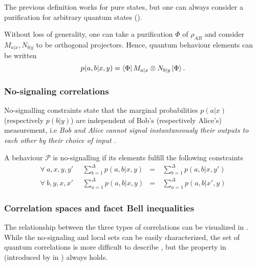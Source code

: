 The previous definition works for pure states, but one can always consider a purification for arbitrary quantum states ().

\begin{proposition} \label{prop:qu_corr} Without loss of generality, one can
take a purification $\Phi$ of $\rho_{AB}$ and consider $M_{a|x} ,N_{b|y}$ to be
orthogonal projectors. Hence, quantum behaviour elements can be written
\begin{equation}
        p(a,b|x,y) = \bra{\Phi}  M_{a|x} \otimes N_{b|y} \ket{\Phi} \text{.}
        \label{eq:qu_corr}
\end{equation} \end{proposition}



\subsubsection{No-signaling correlations}

No-signalling constraints state that the marginal probabilities $p(a|x)$ (respectively $p(b|y)$) are
independent of Bob's (respectively Alice's) measurement, i.e \emph{Bob and Alice cannot signal instantaneously
their outputs to each other by their choice of input} \cite{brunner}.
\begin{definition} A behaviour $\mathcal{P}$ is no-signalling if
its elements fulfill the following constraints
\begin{equation}
\begin{aligned}
    \forall \ a,x,y,y'\;  & \ \sum_{b=1}^\Delta p(a,b|x,y) & = &\ \sum_{b=1}^\Delta p(a,b|x,y')  \\
    \forall \ b,y,x,x'\;  & \ \sum_{a=1}^\Delta p(a,b|x,y) & = &\ \sum_{a=1}^\Delta p(a,b|x',y)
\end{aligned}
\end{equation} \end{definition}

\subsubsection{Correlation spaces and facet Bell inequalities}

The relationship between the three types of correlations can be visualized in . While the no-signaling and local sets can be easily characterized, the set of quantum correlations is more difficult to describe \cite{bell-viol-self-test}, but the property in  (introduced by \citeauthor{popescu_quantum_1994} in \cite{popescu_quantum_1994}) always holds.

